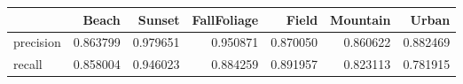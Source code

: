 \begin{tabular}{lrrrrrr}
\toprule
 & Beach & Sunset & FallFoliage & Field & Mountain & Urban \\
\midrule
precision & 0.863799 & 0.979651 & 0.950871 & 0.870050 & 0.860622 & 0.882469 \\
recall & 0.858004 & 0.946023 & 0.884259 & 0.891957 & 0.823113 & 0.781915 \\
\bottomrule
\end{tabular}
